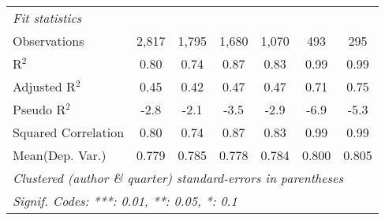 \begin{tabular}{lcccccc}
   \midrule
   \emph{Fit statistics}\\
   Observations                                               & 2,817          & 1,795        & 1,680       & 1,070   & 493           & 295\\  
   R$^2$                                                      & 0.80           & 0.74         & 0.87        & 0.83    & 0.99          & 0.99\\  
   Adjusted R$^2$                                             & 0.45           & 0.42         & 0.47        & 0.47    & 0.71          & 0.75\\  
   Pseudo R$^2$                                               & -2.8           & -2.1         & -3.5        & -2.9    & -6.9          & -5.3\\  
   Squared Correlation                                        & 0.80           & 0.74         & 0.87        & 0.83    & 0.99          & 0.99\\  
Mean(Dep. Var.) & 0.779 & 0.785 & 0.778 & 0.784 & 0.800 & 0.805 \\
   \midrule \midrule
   \multicolumn{7}{l}{\emph{Clustered (author \& quarter) standard-errors in parentheses}}\\
   \multicolumn{7}{l}{\emph{Signif. Codes: ***: 0.01, **: 0.05, *: 0.1}}\\
\end{tabular}
\par\endgroup
